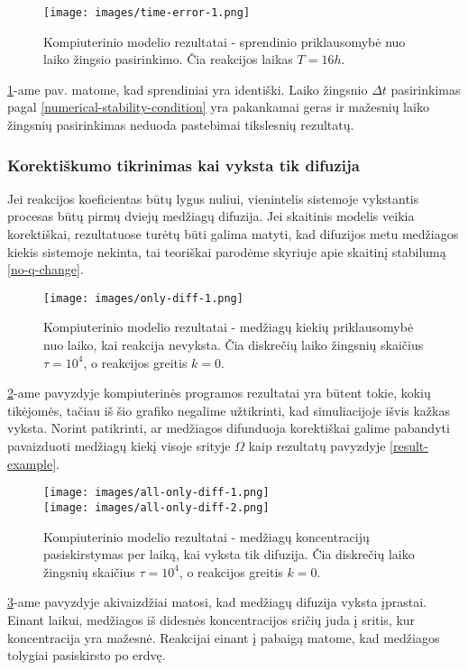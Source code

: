 \begin{figure}[h!]

\centering

\texttt{[image: images/time-error-1.png]}

\caption{Kompiuterinio modelio rezultatai - sprendinio priklausomybė nuo laiko žingsio pasirinkimo. Čia reakcijos laikas $T=16h$.}

\label{time-error}

\end{figure}

\ref{time-error}-ame pav. matome, kad sprendiniai yra identiški. Laiko žingsnio  $\Delta t$ pasirinkimas pagal \eqref{numerical-stability-condition} yra pakankamai geras ir mažesnių laiko žingsnių pasirinkimas neduoda pastebimai tikslesnių rezultatų.

\newpage
\subsubsection*{Korektiškumo tikrinimas kai vyksta tik difuzija}

Jei reakcijos koeficientas būtų lygus nuliui, vienintelis sistemoje vykstantis procesas būtų pirmų dviejų medžiagų difuzija. Jei skaitinis modelis veikia korektiškai, rezultatuose turėtų būti galima matyti, kad difuzijos metu medžiagos kiekis sistemoje nekinta, tai teoriškai parodėme skyriuje apie skaitinį stabilumą \eqref{no-q-change}.

\begin{figure}[h!]
    \centering
    \texttt{[image: images/only-diff-1.png]}
    \caption{Kompiuterinio modelio rezultatai - medžiagų kiekių priklausomybė nuo laiko, kai reakcija nevyksta. Čia diskrečių laiko žingsnių skaičius $\tau=10^4$, o reakcijos greitis $k = 0$. }
    \label{no-reaction}
\end{figure}

\ref{no-reaction}-ame pavyzdyje kompiuterinės programos rezultatai yra būtent tokie, kokių tikėjomės, tačiau iš šio grafiko negalime užtikrinti, kad simuliacijoje išvis kažkas vyksta. Norint patikrinti, ar medžiagos difunduoja korektiškai galime pabandyti pavaizduoti medžiagų kiekį visoje srityje $\Omega$ kaip rezultatų pavyzdyje \eqref{result-example}.

\begin{figure}[h!]
\centering
\texttt{[image: images/all-only-diff-1.png]} \\
\texttt{[image: images/all-only-diff-2.png]}

\caption{Kompiuterinio modelio rezultatai - medžiagų koncentracijų pasiskirstymas per laiką, kai vyksta tik difuzija. Čia diskrečių laiko žingsnių skaičius $\tau=10^4$, o reakcijos greitis $k = 0$. }

\label{only-diffusion}
\end{figure}

\ref{only-diffusion}-ame pavyzdyje akivaizdžiai matosi, kad medžiagų difuzija vyksta įprastai. Einant laikui, medžiagos iš didesnės koncentracijos sričių juda į sritis, kur koncentracija yra mažesnė. Reakcijai einant į pabaigą matome, kad medžiagos tolygiai pasiskirsto po erdvę.


